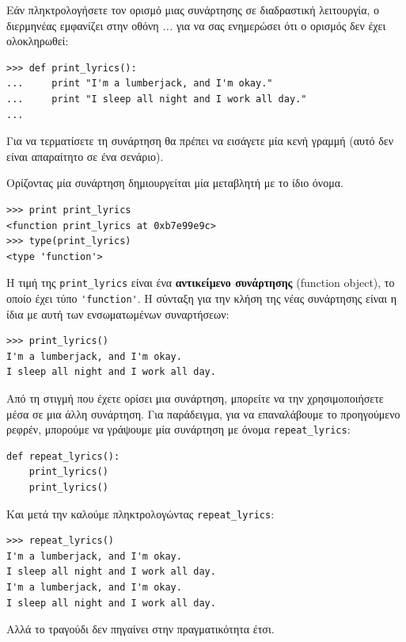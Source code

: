 \documentclass[10pt]{book}
\begin{document}
Εάν πληκτρολογήσετε τον ορισμό μιας συνάρτησης σε διαδραστική λειτουργία,
ο διερμηνέας εμφανίζει στην οθόνη {\em ...} για να σας ενημερώσει
ότι ο ορισμός δεν έχει ολοκληρωθεί:


\begin{verbatim}
>>> def print_lyrics():
...     print "I'm a lumberjack, and I'm okay."
...     print "I sleep all night and I work all day."
...
\end{verbatim}
%

Για να τερματίσετε τη συνάρτηση θα πρέπει να εισάγετε μία κενή
γραμμή (αυτό δεν είναι απαραίτητο σε ένα σενάριο).

Ορίζοντας μία συνάρτηση δημιουργείται μία μεταβλητή με το ίδιο
όνομα.


\begin{verbatim}
>>> print print_lyrics
<function print_lyrics at 0xb7e99e9c>
>>> type(print_lyrics)
<type 'function'>
\end{verbatim}
%

Η τιμή της \verb"print_lyrics" είναι ένα {\bf αντικείμενο συνάρτησης}
(function object), το οποίο έχει τύπο \verb"'function'".
Η σύνταξη για την κλήση της νέας συνάρτησης είναι η ίδια με αυτή των
ενσωματωμένων συναρτήσεων:


\begin{verbatim}
>>> print_lyrics()
I'm a lumberjack, and I'm okay.
I sleep all night and I work all day.
\end{verbatim}
%

Από τη στιγμή που έχετε ορίσει μια συνάρτηση, μπορείτε να την χρησιμοποιήσετε
μέσα σε μια άλλη συνάρτηση. Για παράδειγμα, για να επαναλάβουμε το προηγούμενο
ρεφρέν, μπορούμε να γράψουμε μία συνάρτηση με όνομα \verb"repeat_lyrics":


\begin{verbatim}
def repeat_lyrics():
    print_lyrics()
    print_lyrics()
\end{verbatim}
%

Και μετά την καλούμε πληκτρολογώντας \verb"repeat_lyrics":


\begin{verbatim}
>>> repeat_lyrics()
I'm a lumberjack, and I'm okay.
I sleep all night and I work all day.
I'm a lumberjack, and I'm okay.
I sleep all night and I work all day.
\end{verbatim}
%

Αλλά το τραγούδι δεν πηγαίνει στην πραγματικότητα έτσι.
\end{document}
